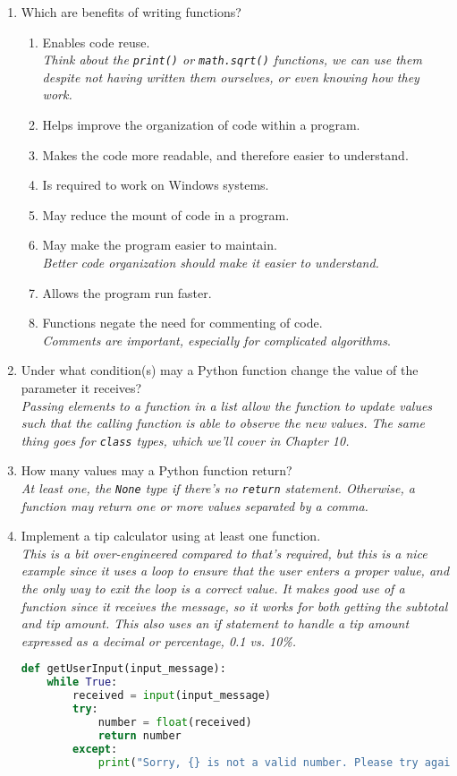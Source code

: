 \documentclass[letter,10pt]{article}
\newcommand*\tick{\item[\Checkmark]}
\newcommand*\fail{\item[\XSolidBrush]}
\begin{document}
\begin{enumerate}
    \item Which are benefits of writing functions?
    \begin{enumerate}
        \tick Enables code reuse. \\
        \textit{Think about the \texttt{print()} or \texttt{math.sqrt()} functions, we can use them despite not having written them ourselves, or even knowing how they work.}
        \tick Helps improve the organization of code within a program.
        \tick Makes the code more readable, and therefore easier to understand.
        \fail Is required to work on Windows systems.
        \tick May reduce the mount of code in a program.
        \tick May make the program easier to maintain. \\
        \textit{Better code organization should make it easier to understand.}
        \fail Allows the program run faster.
        \fail Functions negate the need for commenting of code. \\
        \textit{Comments are important, especially for complicated algorithms}.
    \end{enumerate}

    \item Under what condition(s) may a Python function change the value of the parameter it receives? \\
    \textit{Passing elements to a function in a list allow the function to update values such that the calling function is able to observe the new values. The same thing goes for \texttt{class} types, which we'll cover in Chapter 10.}

    \item How many values may a Python function return? \\
    \textit{At least one, the \texttt{None} type if there's no \texttt{return} statement. Otherwise, a function may return one or more values separated by a comma.}

    \item Implement a tip calculator using at least one function. \\
    \textit{This is a bit over-engineered compared to that's required, but this is a nice example since it uses a loop to ensure that the user enters a proper value, and the only way to exit the loop is a correct value. It makes good use of a function since it receives the message, so it works for both getting the subtotal and tip amount. This also uses an if statement to handle a tip amount expressed as a decimal or percentage, 0.1 vs. 10\%.}
    \begin{lstlisting}[language=python]
def getUserInput(input_message):
    while True:
        received = input(input_message)
        try:
            number = float(received)
            return number
        except:
            print("Sorry, {} is not a valid number. Please try again.".format(received))


\end{lstlisting}
\end{enumerate}
\end{document}
